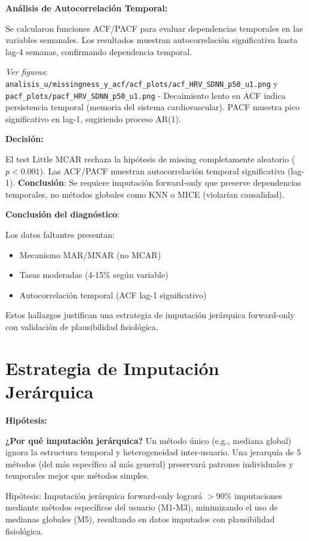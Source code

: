 \documentclass[12pt,letterpaper,twoside]{report}
\begin{document}
\begin{calculobox}
\textbf{Análisis de Autocorrelación Temporal:}

Se calcularon funciones ACF/PACF para evaluar dependencias temporales en las variables semanales. Los resultados muestran autocorrelación significativa hasta lag-4 semanas, confirmando dependencia temporal.

\textit{Ver figuras}: \texttt{analisis\_u/missingness\_y\_acf/acf\_plots/acf\_HRV\_SDNN\_p50\_u1.png} y \texttt{pacf\_plots/pacf\_HRV\_SDNN\_p50\_u1.png} - Decaimiento lento en ACF indica persistencia temporal (memoria del sistema cardiovascular). PACF muestra pico significativo en lag-1, sugiriendo proceso AR(1).
\end{calculobox}

\begin{decisionbox}
\textbf{Decisión:}

El test Little MCAR rechaza la hipótesis de missing completamente aleatorio ($p < 0.001$). Las ACF/PACF muestran autocorrelación temporal significativa (lag-1). \textbf{Conclusión}: Se requiere imputación forward-only que preserve dependencias temporales, no métodos globales como KNN o MICE (violarían causalidad).
\end{decisionbox}

\begin{conclusionbox}
\textbf{Conclusión del diagnóstico}:

Los datos faltantes presentan:
\begin{itemize}[noitemsep]
    \item Mecanismo MAR/MNAR (no MCAR)
    \item Tasas moderadas (4-15\% según variable)
    \item Autocorrelación temporal (ACF lag-1 significativo)
\end{itemize}

Estos hallazgos justifican una estrategia de imputación jerárquica forward-only con validación de plausibilidad fisiológica.
\end{conclusionbox}

\section{Estrategia de Imputación Jerárquica}

\begin{hipotesisbox}
\textbf{Hipótesis:}

\textbf{¿Por qué imputación jerárquica?} Un método único (e.g., mediana global) ignora la estructura temporal y heterogeneidad inter-usuario. Una jerarquía de 5 métodos (del más específico al más general) preservará patrones individuales y temporales mejor que métodos simples.

Hipótesis: Imputación jerárquica forward-only logrará $> 90\%$ imputaciones mediante métodos específicos del usuario (M1-M3), minimizando el uso de medianas globales (M5), resultando en datos imputados con plausibilidad fisiológica.
\end{hipotesisbox}
\end{document}
